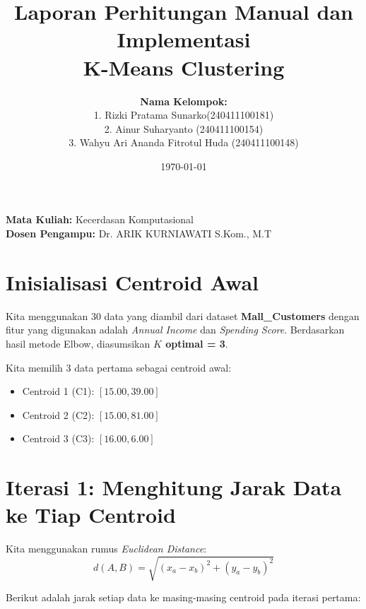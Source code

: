 \documentclass[12pt, a4paper]{article}
\title{\textbf{Laporan Perhitungan Manual dan Implementasi \\ K-Means Clustering}}
\author{
\textbf{Nama Kelompok:} \\
1. Rizki Pratama Sunarko(240411100181) \\
2. Ainur Suharyanto (240411100154) \\
3. Wahyu Ari Ananda Fitrotul Huda (240411100148) \\
}
\date{\today}
\begin{document}
\maketitle

\vspace{-1.5em}
\begin{center}
    \textbf{Mata Kuliah:} Kecerdasan Komputasional \\
    \textbf{Dosen Pengampu:} Dr. ARIK KURNIAWATI S.Kom., M.T
\end{center}

\vspace{1.5em}

\section{Inisialisasi Centroid Awal}
Kita menggunakan 30 data yang diambil dari dataset \textbf{Mall\_Customers} dengan fitur yang digunakan adalah \textit{Annual Income} dan \textit{Spending Score}. Berdasarkan hasil metode Elbow, diasumsikan \textbf{$K$ optimal = 3}.

Kita memilih 3 data pertama sebagai centroid awal:
\begin{itemize}
    \item Centroid 1 (C1): $[15.00, 39.00]$
    \item Centroid 2 (C2): $[15.00, 81.00]$
    \item Centroid 3 (C3): $[16.00, 6.00]$
\end{itemize}

\section{Iterasi 1: Menghitung Jarak Data ke Tiap Centroid}
Kita menggunakan rumus \textit{Euclidean Distance}:
\[ d(A, B) = \sqrt{(x_a - x_b)^2 + (y_a - y_b)^2} \]

Berikut adalah jarak setiap data ke masing-masing centroid pada iterasi pertama:
\end{document}
